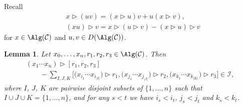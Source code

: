 \documentclass[pdftex]{sigma}
\numberwithin{equation}{section}
\newtheorem{Lemma}[Theorem]{Lemma}
\begin{document}
Recall
\begin{align*}
 & x \rhd (uv)= (x\rhd u)v + u(x\rhd v), \\
& (xu) \rhd v= x \rhd (u \rhd v) - (x \rhd u) \rhd v
\end{align*}
for $x \in \Alg(\mathcal{C})$ and $u,v \in D(\Alg(\mathcal{C}))$.

\begin{Lemma}\label{Lemma_D_property}
Let $x_0, \dots , x_n , r_1 , r_2, r_3 \in \Alg(\mathcal{C})$. Then
\begin{gather*}
 (x_1 \cdots x_n) \rhd [r_1, r_2, r_3] \\
\qquad {}- \sum_{I,J,K} \bigl[\bigl(x_{i_1} \cdots x_{i_{|I|}}\bigr) \rhd r_1, \bigl(x_{j_1} \cdots x_{j_{|J|}}\bigr) \rhd r_2, \bigl(x_{k_1} \cdots x_{k_{|K|}}\bigr) \rhd r_3\bigr] \in \mathcal{I},
\end{gather*}
where $I$, $J$, $K$ are pairwise disjoint subsets of $\{1, \dots , n\}$ such that $I \cup J \cup K = \{1, \dots , n \}$, and for any $s < t$ we have $i_s < i_t$, $j_s < j_t$ and $k_s < k_t$.
\end{Lemma}
\end{document}
